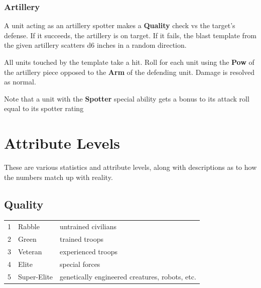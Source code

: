 \documentclass[12pt,titlepage]{article}
\begin{document}
\begin{multicols}{2}
\subsubsection{Artillery}

A unit acting as an artillery spotter makes a {\bf Quality} check vs
the target's defense. If it succeeds, the artillery is on target. If
it fails, the blast template from the given artillery scatters d6
inches in a random direction.

All units touched by the template take a hit. Roll for each unit using
the {\bf Pow} of the artillery piece opposed to the {\bf Arm} of the
defending unit. Damage is resolved as normal.

Note that a unit with the {\bf Spotter} special ability gets a bonus to its
attack roll equal to its spotter rating

\end{multicols}

  \section{Attribute Levels}
  
  These are various statistics and attribute levels, along with
  descriptions as to how the numbers match up with reality.

  \subsection{Quality}
  \begin{tabular}{lll}
    1 & Rabble & untrained civilians \\
    2 & Green  & trained troops \\
    3 & Veteran & experienced troops \\
    4 & Elite & special forces \\
    5 & Super-Elite & genetically engineered creatures, robots, etc.\\
  \end{tabular}
\end{document}
